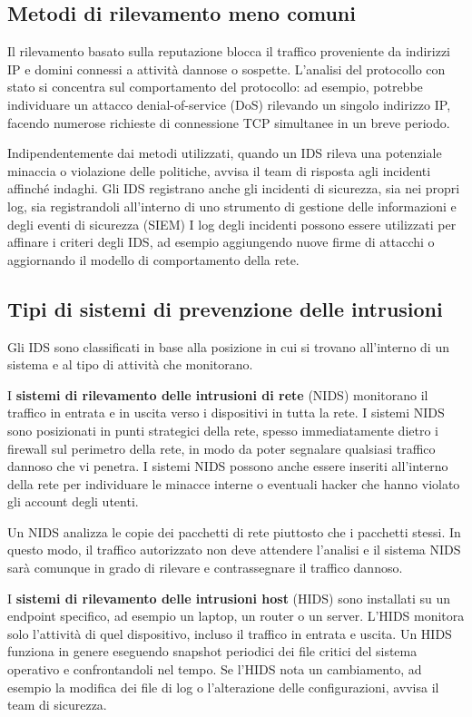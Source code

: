 \subsection{Metodi di rilevamento meno comuni}
Il rilevamento basato sulla reputazione blocca il traffico proveniente da indirizzi IP e domini connessi a attività dannose o sospette. 
L'analisi del protocollo con stato si concentra sul comportamento del protocollo: ad esempio, potrebbe individuare un attacco 
denial-of-service (DoS) rilevando un singolo indirizzo IP, facendo numerose richieste di connessione TCP simultanee in un breve periodo.


Indipendentemente dai metodi utilizzati, quando un IDS rileva una potenziale minaccia o violazione delle politiche, 
avvisa il team di risposta agli incidenti affinché indaghi. 
Gli IDS registrano anche gli incidenti di sicurezza, sia nei propri log, sia registrandoli all'interno di uno strumento di 
gestione delle informazioni e degli eventi di sicurezza (SIEM) 
I log degli incidenti possono essere utilizzati per affinare i criteri degli IDS, ad esempio aggiungendo nuove 
firme di attacchi o aggiornando il modello di comportamento della rete.


\subsection{Tipi di sistemi di prevenzione delle intrusioni}
Gli IDS sono classificati in base alla posizione in cui si trovano all'interno di un sistema e al tipo di attività che monitorano. 

I \textbf{sistemi di rilevamento delle intrusioni di rete} (NIDS) monitorano il traffico in entrata e in uscita verso i dispositivi in tutta la rete. 
I sistemi NIDS sono posizionati in punti strategici della rete, spesso immediatamente dietro i firewall sul perimetro della rete, in modo 
da poter segnalare qualsiasi traffico dannoso che vi penetra.
I sistemi NIDS possono anche essere inseriti all'interno della rete per individuare le minacce interne o eventuali hacker che hanno violato gli account degli utenti.

Un NIDS analizza le copie dei pacchetti di rete piuttosto che i pacchetti stessi. 
In questo modo, il traffico autorizzato non deve attendere l'analisi e il sistema NIDS sarà comunque in grado di rilevare e contrassegnare il traffico dannoso.


I \textbf{sistemi di rilevamento delle intrusioni host} (HIDS) sono installati su un endpoint specifico, ad esempio un laptop, un router o 
un server. L'HIDS monitora solo l'attività di quel dispositivo, incluso il traffico in entrata e uscita. 
Un HIDS funziona in genere eseguendo snapshot periodici dei file critici del sistema operativo e confrontandoli nel tempo. 
Se l'HIDS nota un cambiamento, ad esempio la modifica dei file di log o l'alterazione delle configurazioni, avvisa il team di sicurezza.

